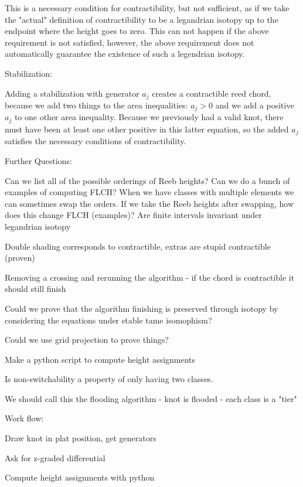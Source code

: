 \documentclass[11pt]{amsart}
\begin{document}
This is a necessary condition for contractibility, but not sufficient, as if we take the "actual" definition of contractibility to be a legandrian isotopy up to the endpoint where the height goes to zero. This can not happen if the above requirement is not satisfied, however, the above requirement does not automatically guarantee the existence of such a legendrian isotopy. 


Stabilization:

Adding a stabilization with generator $a_j$ creates a contractible reed chord, because we add two things to the area inequalities: $a_j>0$ and we add a positive $a_j$ to one other area inequality. Because we previously had a valid knot, there must have been at least one other positive in this latter equation, so the added $a_j$ satisfies the necessary conditions of contractibility. 




Further Questions:



Can we list all of the possible orderings of Reeb heights?
Can we do a bunch of examples of computing FLCH?
When we have classes with multiple elements we can sometimes swap the orders. If we take the Reeb heights after swapping, how does this change FLCH (examples)?
Are finite intervals invariant under legandrian isotopy

Double shading corresponds to contractible, extras are stupid contractible (proven)


Removing a crossing and rerunning the algorithm - if the chord is contractible it should still finish

Could we prove that the algorithm finishing is preserved through isotopy by considering the equations under stable tame isomophism?

Could we use grid projection to prove things?

Make a python script to compute height assignments


Is non-switchability a property of only having two classes.


We should call this the flooding algorithm - knot is flooded  - each class is a "tier" 


Work flow:



Draw knot in plat position, get generators

Ask for z-graded differential

Compute height assignments with python
\end{document}
